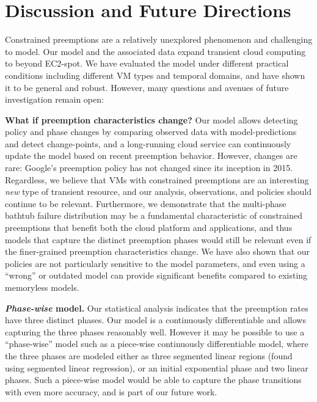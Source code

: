 \vspace*{\subsecspace}
\section{Discussion and Future Directions}
\label{sec:discussion}


Constrained preemptions are a relatively unexplored phenomenon and challenging to model.
Our model and the associated data expand transient cloud computing to beyond EC2-spot.
We have evaluated the model under different practical conditions including different VM types and temporal domains, and have shown it to be general and robust. 
However, many questions and avenues of future investigation remain open:

\noindent \textbf{What if preemption characteristics change?}
Our model allows detecting policy and phase changes by comparing observed data with model-predictions and detect change-points, and 
a long-running cloud service can continuously update the model based on recent preemption behavior. 
However, changes are rare: Google's preemption policy has not changed since its inception in 2015.
%
Regardless, we believe that VMs with constrained preemptions are an interesting \emph{new} type of transient resource, and our analysis, observations, and policies should continue to be relevant. 
Furthermore, we demonstrate that the multi-phase bathtub failure distribution may be a fundamental characteristic of constrained preemptions that benefit both the cloud platform and applications, and thus models that capture the distinct preemption phases would still be relevant even if the finer-grained preemption characteristics change. %
%
We have also shown that our policies are not particularly sensitive to the model parameters, and even using a ``wrong'' or outdated model can provide significant benefits compared to existing memoryless models. 

\noindent \textbf{\emph{Phase-wise} model.}
Our statistical analysis indicates that the preemption rates have three distinct phases. 
Our model is a continuously differentiable and allows capturing the three phases reasonably well. 
However it may be possible to use a ``phase-wise'' model such as a piece-wise continuously differentiable model, where the three phases are modeled either as three segmented linear regions (found using segmented linear regression), or an initial exponential phase and two linear phases. 
Such a piece-wise model would be able to capture the phase transitions with even more accuracy, and is part of our future work. 

